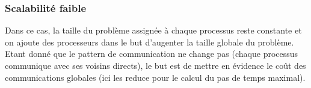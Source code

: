 \subsubsection{Scalabilité faible}
Dans ce cas, la taille du problème assignée à chaque processus reste constante et on ajoute des processeurs dans le but d'augenter la taille globale du problème. Etant donné que le pattern de communication ne change pas (chaque processus communique avec ses voisins directs), le but est de mettre en évidence le coût des communications globales (ici les reduce pour le calcul du pas de temps maximal).






